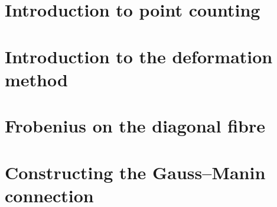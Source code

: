 
\chapter{Introduction to point counting}




\chapter{Introduction to the deformation method}




\chapter{Frobenius on the diagonal fibre}




\chapter{Constructing the Gauss--Manin connection}
\label{ch:GMConnection}




